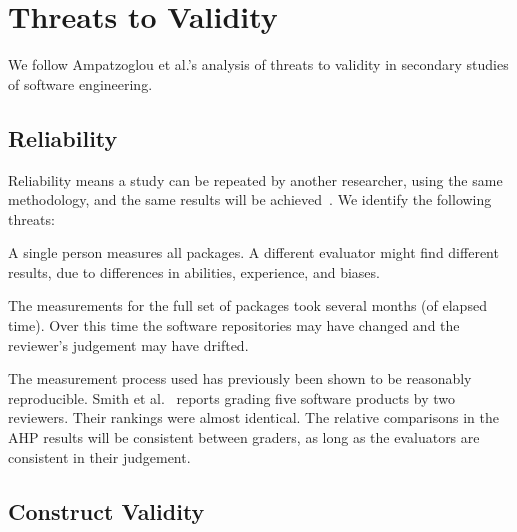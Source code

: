 \documentclass[draft, 12pt, 3p, times]{elsarticle} %
\begin{document}
\section{Threats to Validity} \label{sec_threats_to_validity}

We follow Ampatzoglou et al.'s \cite{AmpatzoglouEtAl2019} analysis of
threats to validity in secondary studies of software engineering.

\subsection{Reliability}

Reliability means a study can be repeated by another researcher, using the same
methodology, and the same results will be achieved~\cite{RunesonAndHost2009}.
We identify the following threats:
\begin{enumerate*}
\item A single person measures all packages. A different evaluator might find
different results, due to differences in abilities, experience, and biases.
\item The measurements for the full set of packages took several months (of
elapsed time).  Over this time the software repositories may have changed and
the reviewer's judgement may have drifted.
\end{enumerate*}

The measurement process used has previously been shown to be reasonably
reproducible.  Smith et al.~\cite{SmithEtAl2016} reports grading five software
products by two reviewers.  Their rankings were almost identical. The relative
comparisons in the AHP results will be consistent between graders, as long as
the evaluators are consistent in their judgement.

\subsection{Construct Validity}
\end{document}
